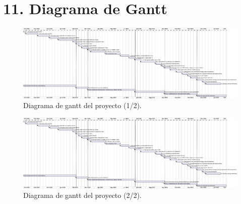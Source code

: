 \documentclass[
    11pt, %
]{charter}
\begin{document}
    \section{11. Diagrama de Gantt}
    \label{sec:gantt}
    \begin{landscape}
      \begin{figure}[htpb]
        \centering
        \includegraphics[height=.85\textheight, trim={0 0 40cm 0},clip]{./Figuras/gantt.png}

        \caption{Diagrama de gantt del proyecto (1/2).} %

        \label{fig:diagGantt1}
      \end{figure}

    \end{landscape}
    \begin{landscape}
      \begin{figure}[htpb]
        \centering
        \includegraphics[height=.85\textheight, trim={30cm 0 0 0},clip]{./Figuras/gantt.png}

        \caption{Diagrama de gantt del proyecto (2/2).} %

        \label{fig:diagGantt2}
      \end{figure}

    \end{landscape}
\end{document}
